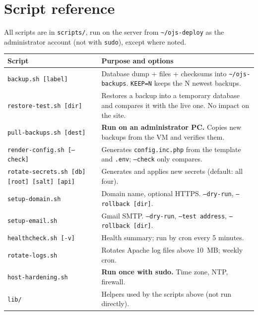 \documentclass[11pt,a4paper]{report}
\newcommand{\code}[1]{\texttt{\small #1}}
\newcommand{\file}[1]{\texttt{\small #1}}
\begin{document}
\chapter{Script reference}\label{app:scripts}
All scripts are in \file{scripts/}, run on the server from \file{\textasciitilde/ojs-deploy} as the
administrator account (not with \code{sudo}), except where noted.
\begin{longtable}{@{}P{4.2cm}P{11.2cm}@{}}
\toprule
\textbf{Script} & \textbf{Purpose and options} \\
\midrule
\endhead
\bottomrule
\endfoot
\file{backup.sh [label]} & Database dump + files + checksums into \file{\textasciitilde/ojs-backups}. \code{KEEP=N} keeps the N newest backups. \\
\file{restore-test.sh [dir]} & Restores a backup into a temporary database and compares it with the live one. No impact on the site. \\
\file{pull-backups.sh [dest]} & \textbf{Run on an administrator PC.} Copies new backups from the VM and verifies them. \\
\file{render-config.sh [--check]} & Generates \file{config.inc.php} from the template and \file{.env}; \code{--check} only compares. \\
\file{rotate-secrets.sh [db] [root] [salt] [api]} & Generates and applies new secrets (default: all four). \\
\file{setup-domain.sh} & Domain name, optional HTTPS. \code{--dry-run}, \code{--rollback [dir]}. \\
\file{setup-email.sh} & Gmail SMTP. \code{--dry-run}, \code{--test address}, \code{--rollback [dir]}. \\
\file{healthcheck.sh [-v]} & Health summary; run by cron every 5 minutes. \\
\file{rotate-logs.sh} & Rotates Apache log files above 10~MB; weekly cron. \\
\file{host-hardening.sh} & \textbf{Run once with sudo.} Time zone, NTP, firewall. \\
\file{lib/} & Helpers used by the scripts above (not run directly). \\
\end{longtable}
\end{document}
